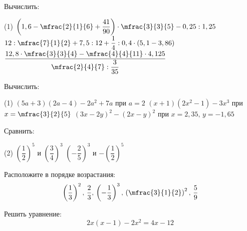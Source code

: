 %
%
%
\begin{class}[number=1]
	\begin{listofex}
		\item Вычислить:
		\begin{tasks}(1)
			\task \( \left( 1,6-\mfrac{2}{1}{6}+\dfrac{41}{90} \right)\cdot\mfrac{3}{3}{5}-0,25:1,25 \)
			\task \( 12:\mfrac{7}{1}{2}+7,5:12+\dfrac{1}{4}:0,4\cdot(5,1-3,86) \)
			\task \( \dfrac{12,8\cdot\mfrac{3}{3}{4}-\mfrac{4}{4}{11}\cdot4,125}{\mfrac{2}{4}{7}:\dfrac{3}{35}} \)
		\end{tasks}
		\item Вычислить:
		\begin{tasks}(1)
			\task \( (5a+3)(2a-4)-2a^2+7a \) при \( a=2 \)
			\task \( (x+1)(2x^2-1)-3x^3 \) при \( x=\mfrac{3}{2}{5} \)
			\task \( (3x-2y)^2-(2x-y)^2 \) при \( x=2,35,\,y=-1,65 \)
		\end{tasks}
		\item Сравнить:
		\begin{tasks}(2)
			\task \( \left( \dfrac{1}{2} \right)^5 \) и \( \left( \dfrac{3}{4} \right)^3 \)
			\task \( \left( -\dfrac{2}{5} \right)^3 \) и \( -\left( \dfrac{1}{2} \right)^5 \)
		\end{tasks}
		\item Расположите в порядке возрастания:
		\[ \left( \dfrac{1}{3} \right)^2,\,\dfrac{2}{3},\,\left( -\dfrac{1}{3} \right)^3,\,\left( \mfrac{3}{1}{2} \right)^2,\,\dfrac{5}{9} \]
		\item Решить уравнение:
		\[ 2x(x-1)-2x^2=4x-12 \]
	\end{listofex}
\end{class}

